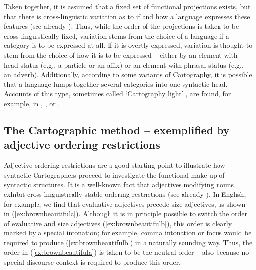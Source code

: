 Taken together, it is assumed that a fixed set of functional projections exists, but that there is cross-linguistic variation as to if and how a language expresses these features (see already \citealt{vergnaud1985dependances}). Thus, while the order of the projections is taken to be cross-linguistically fixed, variation stems from the choice of a language if a category is to be expressed at all. If it is overtly expressed, variation is thought to stem from the choice of how it is to be expressed -- either by an element with head status (e.g., a particle or an affix) or an element with phrasal status (e.g., an adverb). Additionally, according to some variants of Cartography, it is possible that a language lumps together several categories into one syntactic head. Accounts of this type, sometimes called `Cartography light' \citep{van2009alternatives}, are found, for example, in \citet{rizzi1996residual}, \citet{thrainsson1996non}, or \citet{bobaljik1998two}.

\subsection{The Cartographic method -- exemplified by adjective ordering restrictions}

Adjective ordering restrictions are a good starting point to illustrate how syntactic Cartographers proceed to investigate the functional make-up of syntactic structures. It is a well-known fact that adjectives modifying nouns exhibit cross-linguistically stable ordering restrictions (see already \citealt{whorf1945grammatical}). In English, for example, we find that evaluative adjectives precede size adjectives, as shown in (\ref{ex:brownbeautifula}). Although it is in principle possible to switch the order of evaluative and size adjectives (\ref{ex:brownbeautifulb}), this order is clearly marked by a special intonation; for example, comma intonation or focus would be required \citep{sproat1991cross} to produce (\ref{ex:brownbeautifulb}) in a naturally sounding way. Thus, the order in (\ref{ex:brownbeautifula}) is taken to be the neutral order -- also because no special discourse context is required to produce this order.

\begin{exe}
\ex\label{brownbeautiful}\begin{xlist} 
\end{xlist}
\end{exe}

